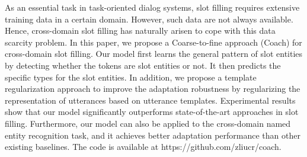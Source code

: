 As an essential task in task-oriented dialog systems, slot filling requires extensive training data in a certain domain. However, such data are not always available. Hence, cross-domain slot filling has naturally arisen to cope with this data scarcity problem. In this paper, we propose a Coarse-to-fine approach (Coach) for cross-domain slot filling. Our model first learns the general pattern of slot entities by detecting whether the tokens are slot entities or not. It then predicts the specific types for the slot entities. In addition, we propose a template regularization approach to improve the adaptation robustness by regularizing the representation of utterances based on utterance templates. Experimental results show that our model significantly outperforms state-of-the-art approaches in slot filling. Furthermore, our model can also be applied to the cross-domain named entity recognition task, and it achieves better adaptation performance than other existing baselines. The code is available at https://github.com/zliucr/coach.
